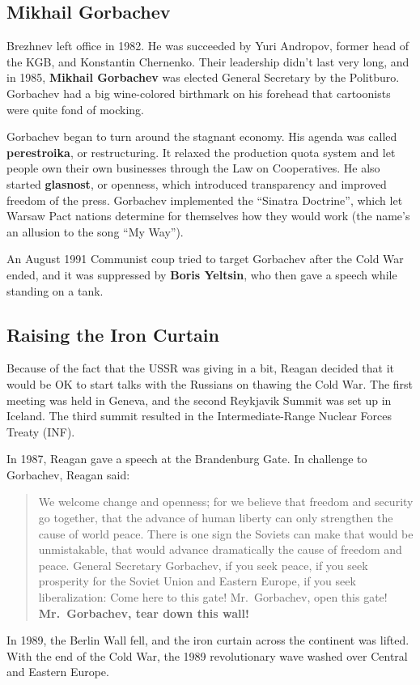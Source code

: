 \subsection*{Mikhail Gorbachev}

Brezhnev left office in 1982.
He was succeeded by Yuri Andropov, former head of the KGB, and Konstantin Chernenko.
Their leadership didn't last very long,
and in 1985, \textbf{Mikhail Gorbachev} was elected General Secretary by the Politburo.
Gorbachev had a big wine-colored birthmark on his forehead
that cartoonists were quite fond of mocking.

Gorbachev began to turn around the stagnant economy.
His agenda was called \textbf{perestroika}, or restructuring.
It relaxed the production quota system
and let people own their own businesses through the Law on Cooperatives.
He also started \textbf{glasnost}, or openness,
which introduced transparency and improved freedom of the press.
Gorbachev implemented the ``Sinatra Doctrine'',
which let Warsaw Pact nations determine for themselves how they would work
(the name's an allusion to the song ``My Way'').

An August 1991 Communist coup tried to target Gorbachev after the Cold War ended,
and it was suppressed by \textbf{Boris Yeltsin}, who then gave a speech while standing on a tank.

\subsection*{Raising the Iron Curtain}

Because of the fact that the USSR was giving in a bit,
Reagan decided that it would be OK to start talks with the Russians on thawing the Cold War.
The first meeting was held in Geneva,
and the second Reykjavik Summit was set up in Iceland.
The third summit resulted in the Intermediate-Range Nuclear Forces Treaty (INF).

In 1987, Reagan gave a speech at the Brandenburg Gate.
In challenge to Gorbachev, Reagan said:
\begin{quote}
  We welcome change and openness; for we believe that freedom and security go together,
  that the advance of human liberty can only strengthen the cause of world peace.
  There is one sign the Soviets can make that would be unmistakable,
  that would advance dramatically the cause of freedom and peace.
  General Secretary Gorbachev, if you seek peace,
  if you seek prosperity for the Soviet Union and Eastern Europe,
  if you seek liberalization:
  Come here to this gate!
  Mr.\ Gorbachev, open this gate!
  \textbf{Mr.\ Gorbachev, tear down this wall!}
\end{quote}

In 1989, the Berlin Wall fell, and the iron curtain across the continent was lifted.
With the end of the Cold War, the 1989 revolutionary wave washed over Central and Eastern Europe.
